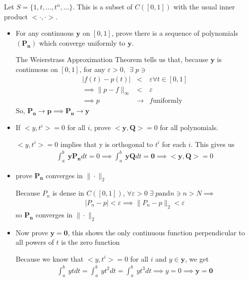 \documentclass[11pt]{SelfArxOneColBMN}
\begin{document}
\begin{exercise}
    Let $S = \{1,t,...,t^n,...\}$. This is a subset of $C([0,1])$ with the usual inner product $<\cdot,\cdot>$.
    \begin{itemize}
        \item For any continuous $\mathbf{y}$ on $[0,1]$, prove there is a sequence of polynomials $\mathbf{(P_n)}$ which converge uniformly to $\textbf{y}$.
        \begin{solution}
            The Weierstrass Approximation Theorem tells us that, because $\mathbf{y}$ is continuous on $[0,1]$, for any $\varepsilon > 0$, $\; \exists \; p \ni$
            \begin{eqnarray*}
                |f(t) - p(t)| &<& \varepsilon \forall t \in [0,1]\\
                \implies \|p - f\|_\infty &<& \varepsilon\\
                \implies p &\rightarrow& f \text{uniformly}
            \end{eqnarray*} 
            So, $\mathbf{P_n} \rightarrow \mathbf{p} \implies \mathbf{P_n} \rightarrow \mathbf{y}$
        \end{solution}
        \item If $<y,t^i> = 0$ for all $i$, prove $<\mathbf{y},\mathbf{Q}> = 0$ for all polynomials.
        \begin{solution}
            $<y,t^i> = 0$ implies that y is orthogonal to $t^i$ for each $i$. This gives us
            \begin{eqnarray*}
                \int_a^b\:\mathbf{y}\mathbf{P_n}dt = {0} \implies \int_a^b\:\mathbf{y}\mathbf{Q}dt = \mathbf{0} \implies <\mathbf{y},\mathbf{Q}> = 0
            \end{eqnarray*}
        \end{solution}
        \item prove $\mathbf{P_n}$ converges in $\|\cdot\|_2$
        \begin{solution}
            Because $P_n$ is dense in $C([0,1])$, $\forall \varepsilon > 0 \; \exists \; p \text{and} n \ni n > N \implies$
            \begin{eqnarray*}
                |P_n - p| < \varepsilon \implies \|P_n - p \|_2 < \varepsilon
            \end{eqnarray*}
            so $\mathbf{P_n}$ converges in $\|\cdot\|_2$
        \end{solution}
        \item Now prove $\mathbf{y} = \mathbf{0}$, this shows the only continuous function perpendicular to all powers of $t$ is the zero function
        \begin{solution}
            Because we know that $<y,t^i> = 0$ for all $i$ and $y \in \mathbf{y}$, we get
            \begin{eqnarray*}
                \int_a^b\:ytdt = \int_a^b\:yt^2dt = \int_a^b\:yt^3dt \implies y = 0 \implies \mathbf{y} = \mathbf{0}
            \end{eqnarray*}
        \end{solution}
    \end{itemize}
\end{exercise}
\end{document}
